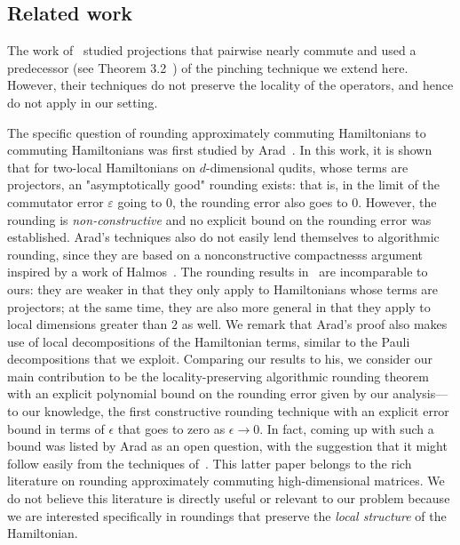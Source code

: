 \documentclass[a4paper,onecolumn,11pt]{quantumarticle}
\theoremstyle{plain}
\newcommand{\eps}{\varepsilon}
\begin{document}
\subsection{Related work}
\label{sec:relatedwork}

The work of~\cite{overlapping} studied projections that pairwise nearly commute and used a predecessor (see Theorem 3.2~\cite{overlapping}) of the pinching technique we extend here. However, their techniques do not preserve the locality of the operators, and hence do not apply in our setting.

The specific question of rounding approximately commuting Hamiltonians to commuting Hamiltonians was first studied by Arad~\cite{arad2011notepartialnogotheorem}. In this work, it is shown that for two-local Hamiltonians on $d$-dimensional qudits, whose terms are projectors, an "asymptotically good" rounding exists: that is, in the limit of the commutator error $\eps$ going to $0$, the rounding error also goes to $0$.  However, the rounding is \emph{non-constructive} and no explicit bound on the rounding error was established. Arad's techniques also do not easily lend themselves to algorithmic rounding, since they are based on a nonconstructive compactnesss argument inspired by a work of Halmos~\cite{halmos1976some}.
The rounding results in~\cite{arad2011notepartialnogotheorem} are incomparable to ours: they are weaker in that they only apply to Hamiltonians whose terms are projectors; at the same time, they are also more general in that they apply to local dimensions greater than $2$ as well.
We remark that Arad's proof also makes use of local decompositions of the Hamiltonian terms, similar to the Pauli decompositions that we exploit. Comparing our results to his, we consider our main contribution to be the locality-preserving algorithmic rounding theorem with an explicit polynomial bound on the rounding error given by our analysis---to our knowledge, the first constructive rounding technique with an explicit error bound in terms of $\epsilon$ that goes to zero as $\epsilon \rightarrow 0$.
In fact, coming up with such a bound was listed by Arad as an open question, with the suggestion that it might follow easily from the techniques of~\cite{pearcy1979almost}. This latter paper belongs to the rich literature on rounding approximately commuting high-dimensional matrices. We do not believe this literature is directly useful or relevant to our problem because we are interested specifically in roundings that preserve the \emph{local structure} of the Hamiltonian. 
\end{document}
